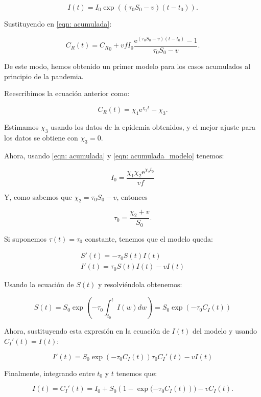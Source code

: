$$I(t) = I_0\exp{((\tau_0 S_0-v)(t-t_0))}.$$

Sustituyendo en \eqref{eqn: acumulada}:

$$C_R(t) = {C_R}_0 + vfI_0\frac{\mathrm{e}^{(\tau_0 S_0 -v)(t-t_0)} -1}{\tau_0 S_0-v}.$$

De este modo, hemos obtenido un primer modelo para los casos acumulados al principio de la pandemia.

Reescribimos la ecuación anterior como:

\begin{equation}
\label{eqn: acumulada_modelo}
C_R(t) = \chi_1 \mathrm{e}^{\chi_2 t} -\chi_3.
\end{equation}

Estimamos $\chi_3$ usando los datos de la epidemia obtenidos, y el mejor ajuste para los datos se obtiene con $\chi_3=0$.

Ahora, usando \eqref{eqn: acumulada} y \eqref{eqn: acumulada_modelo} tenemos:

\begin{equation}
I_0=\frac{\chi_1\chi_2\mathrm{e}^{\chi_2 t_0}}{vf}
\end{equation}

Y, como sabemos que $\chi_2 = \tau_0 S_0-v$, entonces

\begin{equation}
\tau_0 = \frac{\chi_2+v}{S_0}.
\end{equation}

Si suponemos $\tau (t) = \tau_0$ constante, tenemos que el modelo queda:

\begin{equation}
\begin{aligned}
S'(t) = -\tau_0S(t)I(t) \\
I'(t) = \tau_0S(t)I(t) -vI(t)
\end{aligned}
\end{equation}

Usando la ecuación de $S(t)$ y resolviéndola obtenemos:

$$S(t) = S_0\exp{\left( -\tau_0 \int_{t_0}^t I(w) dw \right)} = S_0\exp{(-\tau_0 C_I(t))}$$

Ahora, sustituyendo esta expresión en la ecuación de $I(t)$ del modelo y usando $C_I'(t)=I(t)$:

$$I'(t) = S_0\exp{\left( -\tau_0 C_I(t)\right) }\tau_0 C_I'(t)-vI(t)$$

Finalmente, integrando entre $t_0$ y $t$ tenemos que:

$$I(t)=C_I'(t)=I_0+S_0(1-\exp{(-\tau_0 C_I(t)}))-vC_I(t).$$
 
